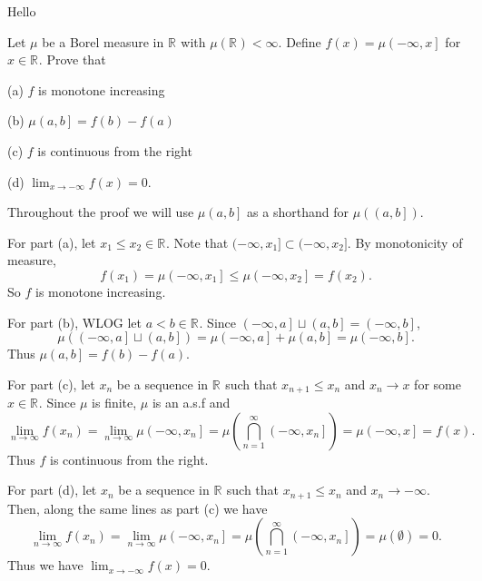 Hello

\begin{problem}{1}
  Let $\mu$ be a Borel measure in $\mathbb{R}^{}$ with $\mu\left( \mathbb{R}^{} \right) < \infty$.
  Define $f\left( x \right) = \mu\left( - \infty, x  \right]$ for $x \in \mathbb{R}^{}$.
  Prove that

  (a) $f$ is monotone increasing

  (b) $\mu \left( a,b \right] = f\left( b \right) - f\left( a \right)$

  (c) $f$ is continuous from the right

  (d) $\lim_{x \to -\infty} f\left( x  \right) = 0$.
\end{problem}

\begin{solution}
  Throughout the proof we will use $\mu\left( a,b \right]$ as a shorthand for $\mu\left( \left( a,b \right] \right)$.

  For part (a), let $x_{1} \leq x_{2} \in \mathbb{R}^{}$.
  Note that $(-\infty, x_{1}] \subset (-\infty, x_{2}]$.
  By monotonicity of measure,
  \[
    f\left( x_{1} \right) = \mu \left( -\infty, x_{1} \right] \leq \mu \left( -\infty, x_{2} \right] = f\left( x_{2} \right)
  .\] 
  So $f$ is monotone increasing.

  For part (b), WLOG let $a < b \in \mathbb{R}^{}$.
  Since $\left( -\infty, a \right] \sqcup \left( a,b \right] = \left( -\infty,b \right]$, 
  \[
    \mu \left( \left( -\infty, a \right] \sqcup \left( a,b \right] \right) = \mu \left( -\infty, a \right] + \mu \left( a,b \right] = \mu \left( -\infty, b \right]
  .\] 
  Thus $\mu\left( a,b \right] = f\left( b \right) - f\left( a \right)$.

  For part (c), let $x_{n}$ be a sequence in $\mathbb{R}^{}$ such that $x_{n+1} \leq x_{n}$ and $x_{n} \to x$ for some $x \in \mathbb{R}^{}$.
  Since $\mu$ is finite, $\mu$ is an a.s.f and 
  \[
    \lim_{n \to \infty} f\left( x_{n} \right) = \lim_{n \to \infty} \mu \left( -\infty, x_{n} \right] = \mu\left( \bigcap_{n=1}^{\infty}\left( -\infty,x_{n} \right] \right) = \mu\left( -\infty,x \right] = f(x)
  .\] 
  Thus $f$ is continuous from the right.

  For part (d), let $x_{n}$ be a sequence in $\mathbb{R}^{}$ such that $x_{n+1} \leq x_{n}$ and $x_{n} \to -\infty$. 
  Then, along the same lines as part (c) we have 
  \[
    \lim_{n \to \infty} f\left( x_{n} \right) = \lim_{n \to \infty} \mu \left( -\infty, x_{n} \right] = \mu\left( \bigcap_{n=1}^{\infty}\left( -\infty,x_{n} \right] \right) = \mu\left( \emptyset \right) = 0
  .\]
  Thus we have $\lim_{x \to -\infty} f\left( x  \right) = 0$.
\end{solution}

